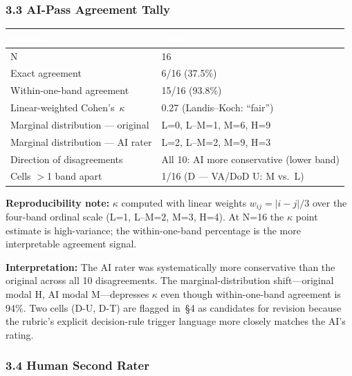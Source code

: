 \subsubsection*{3.3 AI-Pass Agreement Tally}

\begin{table}[H]
\footnotesize
\centering
\setlength{\tabcolsep}{8pt}
\renewcommand{\arraystretch}{1.3}
\begin{tabular}{p{7.5cm} p{7.5cm}}
\toprule
\rowcolor{headerblue}
\textcolor{white}{\textbf{Statistic}} &
\textcolor{white}{\textbf{Value}} \\
\midrule
\rowcolor{rowgray}
N & 16 \\
Exact agreement & 6/16 (37.5\%) \\
\rowcolor{rowgray}
Within-one-band agreement & 15/16 (93.8\%) \\
Linear-weighted Cohen's~$\kappa$ & 0.27 (Landis--Koch: ``fair'') \\
\rowcolor{rowgray}
Marginal distribution --- original & L=0, L--M=1, M=6, H=9 \\
Marginal distribution --- AI rater & L=2, L--M=2, M=9, H=3 \\
\rowcolor{rowgray}
Direction of disagreements & All 10: AI more conservative (lower band) \\
Cells $>$1 band apart & 1/16 (D --- VA/DoD U: M vs.\ L) \\
\bottomrule
\end{tabular}
\end{table}

\noindent\textbf{Reproducibility note:}
$\kappa$ computed with linear weights $w_{ij} = |i-j|/3$ over the four-band ordinal
scale (L=1, L--M=2, M=3, H=4). At N=16 the $\kappa$ point estimate is high-variance;
the within-one-band percentage is the more interpretable agreement signal.

\medskip
\noindent\textbf{Interpretation:} The AI rater was systematically more conservative than
the original across all 10 disagreements. The marginal-distribution shift---original modal
H, AI modal M---depresses $\kappa$ even though within-one-band agreement is 94\%.
Two cells (D-U, D-T) are flagged in~§4 as candidates for revision because the rubric's
explicit decision-rule trigger language more closely matches the AI's rating.

\subsubsection*{3.4 Human Second Rater}

